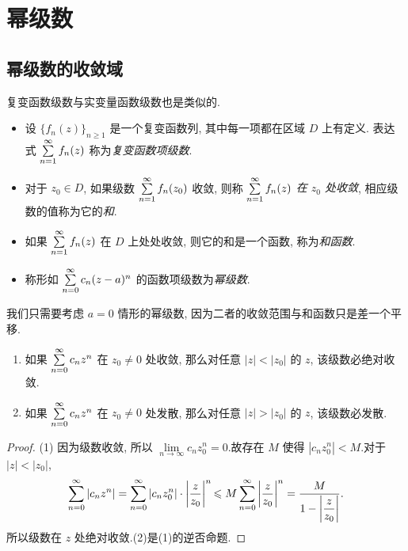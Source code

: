 \documentclass[nocolor,theme=doremi,lang=cn,11pt,chinese,twoside,openright,usesamecnt]{elegantbook}
\newenvironment{block}[1]{\begin{tcolorbox}[blockstyle,title=#1]}{\end{tcolorbox}}
\newcommand\enumnum[1]{{\mdseries\upshape\textcolor[rgb]{.2,.2,.7}{(#1)}}}
\begin{document}
\section{幂级数}

\subsection{幂级数的收敛域}

复变函数级数与实变量函数级数也是类似的.

\begin{definition}
	\begin{itemize}
		\item 设 $\{f_n(z)\}_{n\ge 1}$ 是一个复变函数列, 其中每一项都在区域 $D$ 上有定义.
		表达式 $\sum\limits_{n=1}^\infty f_n(z)$ 称为\emph{复变函数项级数}.
		\item 对于 $z_0\in D$, 如果级数 $\sum\limits_{n=1}^\infty f_n(z_0)$ 收敛, 则称 \emph{$\sum\limits_{n=1}^\infty f_n(z)$ 在 $z_0$ 处收敛}, 相应级数的值称为它的\emph{和}.
		\item 如果 $\sum\limits_{n=1}^\infty f_n(z)$ 在 $D$ 上处处收敛, 则它的和是一个函数, 称为\emph{和函数}.
		\item 称形如 $\sum\limits_{n=0}^\infty c_n(z-a)^n$ 的函数项级数为\emph{幂级数}.
	\end{itemize}
\end{definition}

我们只需要考虑 $a=0$ 情形的幂级数, 因为二者的收敛范围与和函数只是差一个平移.

\begin{block}{阿贝尔定理}
	\begin{enumerate}
		\item 如果 $\sum\limits_{n=0}^\infty c_nz^n$ 在 $z_0\neq 0$ 处收敛, 那么对任意 $|z|<|z_0|$ 的 $z$, 该级数必绝对收敛.
		\item 如果 $\sum\limits_{n=0}^\infty c_nz^n$ 在 $z_0\neq 0$ 处发散, 那么对任意 $|z|>|z_0|$ 的 $z$, 该级数必发散.
	\end{enumerate}
\end{block}

\begin{proof}
	{\enumnum1 因为级数收敛, 所以 $\lim\limits_{n\to\infty}c_n z_0^n=0$.故存在 $M$ 使得 $|c_nz_0^n|<M$.对于 $|z|<|z_0|$,
		\[\sum_{n=0}^\infty|c_nz^n|=\sum_{n=0}^\infty|c_nz_0^n|\cdot\left|\frac z{z_0}\right|^n
		{\leqslant M\sum_{n=0}^\infty\left|\frac z{z_0}\right|^n
		=\frac{M}{1-\left|\dfrac z{z_0}\right|}.}\]所以级数在 $z$ 处绝对收敛.\enumnum2是\enumnum1的逆否命题.\qedhere}
\end{proof}
\end{document}
